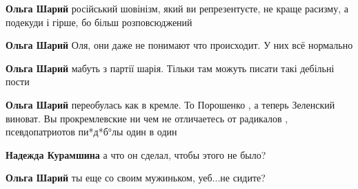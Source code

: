 \begin{itemize}
\begin{itemize}
\textbf{Ольга Шарий} російський шовінізм, який ви репрезентуєте, не краще расизму, а подекуди і гірше, бо більш розповсюджений

 
\textbf{Ольга Шарий} Оля, они даже не понимают что происходит. У них всё нормально

 
\textbf{Ольга Шарий} мабуть з партії шарія. Тільки там можуть писати такі дебільні пости

 
\textbf{Ольга Шарий} переобулась как в кремле. То Порошенко , а теперь Зеленский виноват. Вы прокремлевские ни чем не отличаетесь от радикалов , псевдопатриотов \Laughey[1.0][white] пи*д*б°лы один в один

 
\textbf{Надежда Курамшина} а что он сделал, чтобы этого не было?

 
\textbf{Ольга Шарий} ты еще со своим мужиньком, уеб...не сидите?

 

\end{itemize}
\end{itemize}
